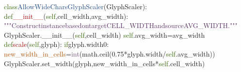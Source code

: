 \ESHBol{}\textcolor[HTML]{346604}{class}\ESHSpace{}\textcolor[HTML]{204A87}{AllowWideCharsGlyphScaler}(GlyphScaler):\ESHEol
\ESHBol{}\ESHSpace{}\ESHSpace{}\ESHSpace{}\ESHSpace{}\textcolor[HTML]{346604}{def}\ESHSpace{}\textcolor[HTML]{A40000}{\_\_init\_\_}(\textcolor[HTML]{346604}{self},\ESHSpace{}cell\_width,\ESHSpace{}avg\_width):\ESHEol
\ESHBol{}\ESHSpace{}\ESHSpace{}\ESHSpace{}\ESHSpace{}\ESHSpace{}\ESHSpace{}\ESHSpace{}\ESHSpace{}\textcolor[HTML]{5C3566}{"""Construct\ESHSpace{}instance\ESHSpace{}based\ESHSpace{}on\ESHSpace{}target\ESHSpace{}CELL\_WIDTH\ESHSpace{}and\ESHSpace{}source\ESHSpace{}AVG\_WIDTH."""}\ESHEol
\ESHBol{}\ESHSpace{}\ESHSpace{}\ESHSpace{}\ESHSpace{}\ESHSpace{}\ESHSpace{}\ESHSpace{}\ESHSpace{}GlyphScaler.\_\_init\_\_(\textcolor[HTML]{346604}{self},\ESHSpace{}cell\_width)\ESHEol
\ESHBol{}\ESHSpace{}\ESHSpace{}\ESHSpace{}\ESHSpace{}\ESHSpace{}\ESHSpace{}\ESHSpace{}\ESHSpace{}\textcolor[HTML]{346604}{self}.avg\_width\ESHSpace{}=\ESHSpace{}avg\_width\ESHEol
\ESHBol{}\ESHEmptyLine{}\ESHEol
\ESHBol{}\ESHSpace{}\ESHSpace{}\ESHSpace{}\ESHSpace{}\textcolor[HTML]{346604}{def}\ESHSpace{}\textcolor[HTML]{A40000}{scale}(\textcolor[HTML]{346604}{self},\ESHSpace{}glyph):\ESHEol
\ESHBol{}\ESHSpace{}\ESHSpace{}\ESHSpace{}\ESHSpace{}\ESHSpace{}\ESHSpace{}\ESHSpace{}\ESHSpace{}\textcolor[HTML]{346604}{if}\ESHSpace{}glyph.width\ESHSpace{}{>}\ESHSpace{}0:\ESHEol
\ESHBol{}\ESHSpace{}\ESHSpace{}\ESHSpace{}\ESHSpace{}\ESHSpace{}\ESHSpace{}\ESHSpace{}\ESHSpace{}\ESHSpace{}\ESHSpace{}\ESHSpace{}\ESHSpace{}\textcolor[HTML]{B35000}{new\_width\_in\_cells}\ESHSpace{}=\ESHSpace{}\textcolor[HTML]{75507B}{int}(math.ceil(0.75\ESHSpace{}*\ESHSpace{}glyph.width\ESHSpace{}/\ESHSpace{}\textcolor[HTML]{346604}{self}.avg\_width))\ESHEol
\ESHBol{}\ESHSpace{}\ESHSpace{}\ESHSpace{}\ESHSpace{}\ESHSpace{}\ESHSpace{}\ESHSpace{}\ESHSpace{}\ESHSpace{}\ESHSpace{}\ESHSpace{}\ESHSpace{}\ESHEol
\ESHBol{}\ESHSpace{}\ESHSpace{}\ESHSpace{}\ESHSpace{}\ESHSpace{}\ESHSpace{}\ESHSpace{}\ESHSpace{}\ESHSpace{}\ESHSpace{}\ESHSpace{}\ESHSpace{}\ESHEol
\ESHBol{}\ESHSpace{}\ESHSpace{}\ESHSpace{}\ESHSpace{}\ESHSpace{}\ESHSpace{}\ESHSpace{}\ESHSpace{}\ESHSpace{}\ESHSpace{}\ESHSpace{}\ESHSpace{}GlyphScaler.set\_width(glyph,\ESHSpace{}new\_width\_in\_cells\ESHSpace{}*\ESHSpace{}\textcolor[HTML]{346604}{self}.cell\_width)